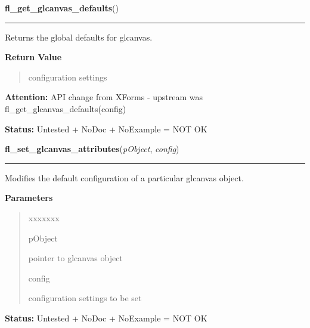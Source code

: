 \hspace{.8\funcindent}\begin{boxedminipage}{\funcwidth}

    \raggedright \textbf{fl\_get\_glcanvas\_defaults}()

    \vspace{-1.5ex}

    \rule{\textwidth}{0.5\fboxrule}
\setlength{\parskip}{2ex}
    Returns the global defaults for glcanvas.

\setlength{\parskip}{1ex}
      \textbf{Return Value}
    \vspace{-1ex}

      \begin{quote}
      configuration settings

      \end{quote}

\textbf{Attention:} API change from XForms - upstream was fl\_get\_glcanvas\_defaults(config)



\textbf{Status:} Untested + NoDoc + NoExample = NOT OK



    \end{boxedminipage}

    \label{xformslib:library:fl_set_glcanvas_attributes}

    \vspace{0.5ex}

\hspace{.8\funcindent}\begin{boxedminipage}{\funcwidth}

    \raggedright \textbf{fl\_set\_glcanvas\_attributes}(\textit{pObject}, \textit{config})

    \vspace{-1.5ex}

    \rule{\textwidth}{0.5\fboxrule}
\setlength{\parskip}{2ex}
    Modifies the default configuration of a particular glcanvas object.

\setlength{\parskip}{1ex}
      \textbf{Parameters}
      \vspace{-1ex}

      \begin{quote}
        \begin{Ventry}{xxxxxxx}

          \item[pObject]

          pointer to glcanvas object

          \item[config]

          configuration settings to be set

        \end{Ventry}

      \end{quote}

\textbf{Status:} Untested + NoDoc + NoExample = NOT OK



    \end{boxedminipage}

